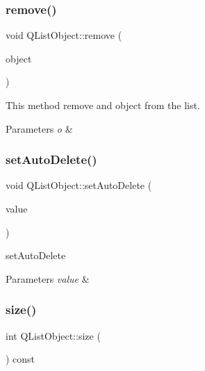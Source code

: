 \subsubsection{\texorpdfstring{remove()}{remove()}}
{\footnotesize\ttfamily void Q\+List\+Object\+::remove (\begin{DoxyParamCaption}\item[{Q\+Object $\ast$}]{object }\end{DoxyParamCaption})\hspace{0.3cm}{\ttfamily [inline]}}



This method remove and object from the list. 


\begin{DoxyParams}{Parameters}
{\em o} & \\
\hline
\end{DoxyParams}
\mbox{\label{class_q_list_object_a6c30632fb46f8f7d404f77a9fea49bee}} 
\subsubsection{\texorpdfstring{set\+Auto\+Delete()}{setAutoDelete()}}
{\footnotesize\ttfamily void Q\+List\+Object\+::set\+Auto\+Delete (\begin{DoxyParamCaption}\item[{bool}]{value }\end{DoxyParamCaption})\hspace{0.3cm}{\ttfamily [inline]}}



set\+Auto\+Delete 


\begin{DoxyParams}{Parameters}
{\em value} & \\
\hline
\end{DoxyParams}
\mbox{\label{class_q_list_object_a4ded55097ea08fa5781240883a591216}} 
\subsubsection{\texorpdfstring{size()}{size()}}
{\footnotesize\ttfamily int Q\+List\+Object\+::size (\begin{DoxyParamCaption}{ }\end{DoxyParamCaption}) const\hspace{0.3cm}{\ttfamily [inline]}}



